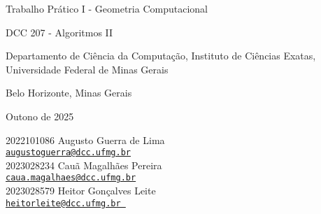 \documentclass{article}
\begin{document}
\begin{center}
    {
    \Large
    Trabalho Prático I - Geometria Computacional

    DCC 207 - Algoritmos II
    
    }

    Departamento de Ciência da Computação, Instituto de Ciências Exatas, Universidade Federal de Minas Gerais

    Belo Horizonte, Minas Gerais

    Outono de 2025
\end{center}

\begin{flushright}
2022101086  Augusto Guerra de Lima\\
\href{mailto:augustoguerra@dcc.ufmg.br}{\texttt{augustoguerra@dcc.ufmg.br}}\\
2023028234  Cauã Magalhães Pereira\\
\href{mailto:caua.magalhaes@dcc.ufmg.br}{\texttt{caua.magalhaes@dcc.ufmg.br}} \\
2023028579  Heitor Gonçalves Leite\\
\href{mailto:heitorleite@dcc.ufmg.br }{\texttt{heitorleite@dcc.ufmg.br }}
\end{flushright}
\vspace{1cm}
\end{document}
